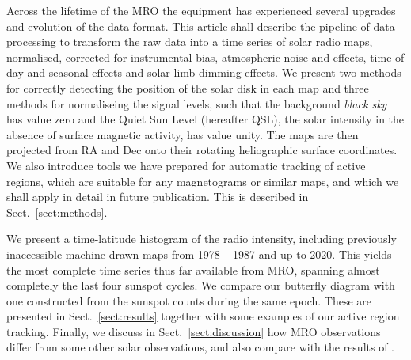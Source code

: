 \documentclass{aa}
\begin{document}
  Across the lifetime of the MRO the equipment has experienced several upgrades
  and evolution of the data format.
  This article shall describe the pipeline of data processing to transform the
  raw data into a time series of solar radio maps, normalised, corrected for
  instrumental bias, atmospheric noise and effects, time of day and seasonal
  effects and solar limb dimming effects.
  We present two methods for correctly detecting the position of the solar disk
  in each map and three methods for normaliseing the signal levels, such that
  the background \emph{black sky} has value zero and the 
  Quiet Sun Level (hereafter QSL),
  the solar intensity in the absence of surface magnetic activity, has
  value unity.
  The maps are then projected from RA and Dec onto their rotating heliographic
  surface coordinates.
  We also introduce tools we have prepared for automatic tracking of active 
  regions, which are suitable for any magnetograms or similar maps, and which
  we shall apply in detail in future publication.
  This is described in Sect.~\ref{sect:methods}.

  We present a time-latitude histogram of the radio intensity,
  including previously inaccessible machine-drawn maps from 1978 -- 1987 and
  up to 2020.
  This yields the most complete time series thus far available from MRO, 
  spanning almost completely the last four sunspot cycles.
  We compare our butterfly diagram with one constructed from the sunspot 
  counts during the same epoch.
  These are presented in Sect.~\ref{sect:results} together with some 
  examples of our active region tracking.
  Finally, we discuss in Sect.~\ref{sect:discussion} 
  how MRO observations differ from some other solar observations, 
  and also compare with the results of \citet{Shibasaki13}. 
\end{document}
